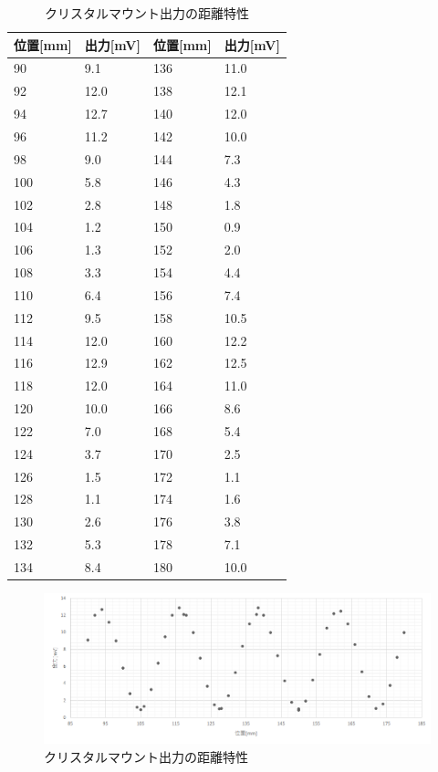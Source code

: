 \newpage
\begin{table}[]
  \centering
  \caption{クリスタルマウント出力の距離特性}
  \begin{tabular}{|l|l||l|l|}
  \hline
  位置{[}mm{]} & 出力{[}mV{]} & 位置{[}mm{]} & 出力{[}mV{]} \\ \hline
  90& 9.1& 136& 11.0\\ \hline
  92& 12.0& 138& 12.1\\ \hline
  94& 12.7& 140& 12.0\\ \hline
  96& 11.2& 142& 10.0\\ \hline
  98& 9.0& 144& 7.3\\ \hline
  100& 5.8& 146& 4.3\\ \hline
  102& 2.8& 148& 1.8\\ \hline
  104& 1.2& 150& 0.9\\ \hline
  106& 1.3& 152& 2.0\\ \hline
  108& 3.3& 154& 4.4\\ \hline
  110& 6.4& 156& 7.4\\ \hline
  112& 9.5& 158& 10.5\\ \hline
  114& 12.0& 160& 12.2\\ \hline
  116& 12.9& 162& 12.5\\ \hline
  118& 12.0& 164& 11.0\\ \hline
  120& 10.0& 166& 8.6\\ \hline
  122& 7.0& 168& 5.4\\ \hline
  124& 3.7& 170& 2.5\\ \hline
  126& 1.5& 172& 1.1\\ \hline
  128& 1.1& 174& 1.6\\ \hline
  130& 2.6& 176& 3.8\\ \hline
  132& 5.3& 178& 7.1\\ \hline
  134& 8.4& 180& 10.0\\ \hline
  \end{tabular}
\end{table}

\newpage
\begin{landscape}
  \begin{figure}
    \centering
    \includegraphics[width=25cm]{./data/data.png}
    \caption{クリスタルマウント出力の距離特性}
  \end{figure}
\end{landscape}

